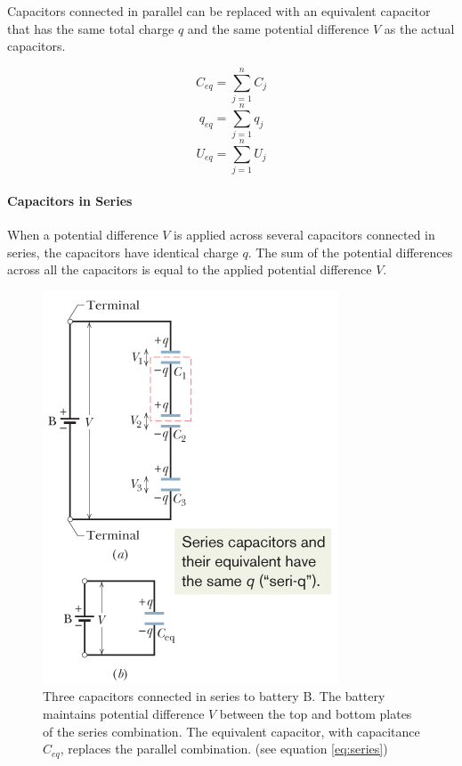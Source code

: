 \documentclass{article}
\begin{document}
        Capacitors connected in parallel can be replaced with an equivalent capacitor that has the same total charge $q$ and the same potential difference $V$ as the actual capacitors.

        \begin{equation} \label{eq:parallel}
            C_{eq} = \sum_{j=1}^n C_j
        \end{equation}
        \begin{equation}
            q_{eq} = \sum_{j=1}^n q_j
        \end{equation}
        \begin{equation}
            U_{eq} = \sum_{j=1}^n U_j
        \end{equation}

        \paragraph{Capacitors in Series}
        When a potential difference $V$ is applied across several capacitors connected in series, the capacitors have identical charge $q$. The sum of the potential differences across all the capacitors is equal to the applied potential difference $V$.

        \begin{figure}[H]
            \centering
            \includegraphics[scale=0.6]{series}
            \caption{Three capacitors connected in series to battery B. The battery maintains potential difference $V$ between the top and bottom plates of the series combination. The equivalent capacitor, with capacitance $C_{eq}$, replaces the parallel combination. (see equation \ref{eq:series})}
        \end{figure}
\end{document}
